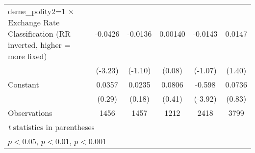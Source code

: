 {\begin{tabular*}{\linewidth}{@{\hskip\tabcolsep\extracolsep\fill}l*{5}{c}}
\addlinespace
deme\_polity2=1 $\times$ Exchange Rate Classification (RR inverted, higher = more fixed)&  -0.0426\sym{**} &  -0.0136         &  0.00140         &  -0.0143         &   0.0147         \\
                &  (-3.23)         &  (-1.10)         &   (0.08)         &  (-1.07)         &   (1.40)         \\
\addlinespace
Constant        &   0.0357         &   0.0235         &   0.0806         &   -0.598\sym{***}&   0.0736         \\
                &   (0.29)         &   (0.18)         &   (0.41)         &  (-3.92)         &   (0.83)         \\
\midrule
Observations    &     1456         &     1457         &     1212         &     2418         &     3799         \\
\bottomrule
\multicolumn{6}{l}{\footnotesize \textit{t} statistics in parentheses}\\
\multicolumn{6}{l}{\footnotesize \sym{*} \(p<0.05\), \sym{**} \(p<0.01\), \sym{***} \(p<0.001\)}\\
\end{tabular*}
}
